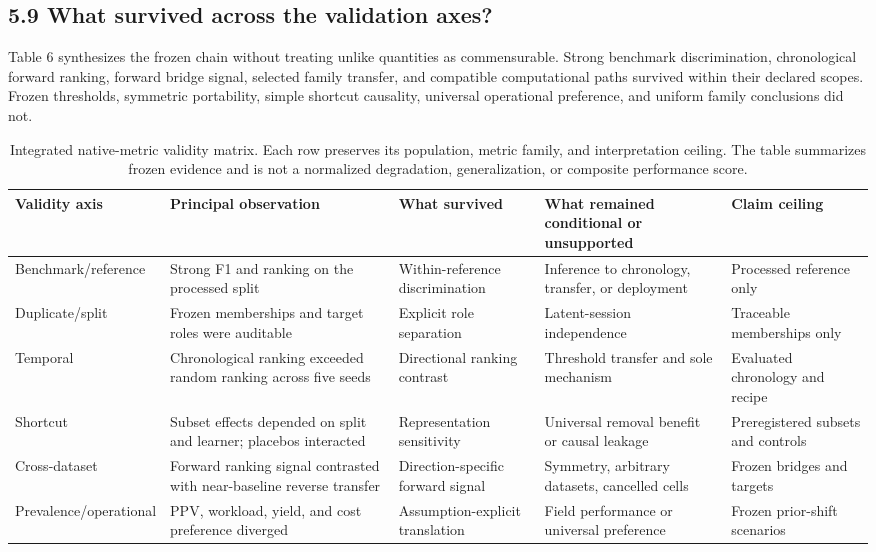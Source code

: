 \documentclass[preprint,12pt]{elsarticle}
\begin{document}
\subsection{5.9 What survived across the validation axes?}
Table 6 synthesizes the frozen chain without treating unlike quantities as commensurable. Strong benchmark discrimination, chronological forward ranking, forward bridge signal, selected family transfer, and compatible computational paths survived within their declared scopes. Frozen thresholds, symmetric portability, simple shortcut causality, universal operational preference, and uniform family conclusions did not.
\begin{table}[htbp]
\centering
\scriptsize
\setlength{\tabcolsep}{2pt}
\renewcommand{\arraystretch}{0.82}
\caption{Integrated native-metric validity matrix. Each row preserves its population, metric family, and interpretation ceiling. The table summarizes frozen evidence and is not a normalized degradation, generalization, or composite performance score.}
\begin{tabularx}{\textwidth}{@{}>{\raggedright\arraybackslash}X*{4}{>{\raggedright\arraybackslash}X}@{}}
\toprule
Validity axis & Principal observation & What survived & What remained conditional or unsupported & Claim ceiling \\
\midrule
Benchmark/\allowbreak reference & Strong F1 and ranking on the processed split & Within-reference discrimination & Inference to chronology, transfer, or deployment & Processed reference only \\
Duplicate/split & Frozen memberships and target roles were auditable & Explicit role separation & Latent-session independence & Traceable memberships only \\
Temporal & Chronological ranking exceeded random ranking across five seeds & Directional ranking contrast & Threshold transfer and sole mechanism & Evaluated chronology and recipe \\
Shortcut & Subset effects depended on split and learner; placebos interacted & Representation sensitivity & Universal removal benefit or causal leakage & Preregistered subsets and controls \\
Cross-dataset & Forward ranking signal contrasted with near-baseline reverse transfer & Direction-specific forward signal & Symmetry, arbitrary datasets, cancelled cells & Frozen bridges and targets \\
Prevalence/\allowbreak operational & PPV, workload, yield, and cost preference diverged & Assumption-explicit translation & Field performance or universal preference & Frozen prior-shift scenarios \\

\end{tabularx}
\end{table}
\end{document}
